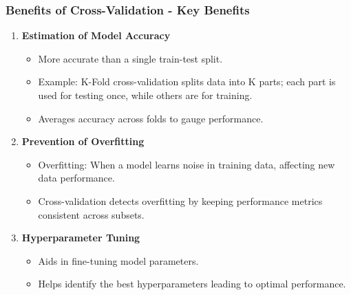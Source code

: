 \documentclass[aspectratio=169]{beamer}
\begin{document}
\begin{frame}[fragile]
    \frametitle{Benefits of Cross-Validation - Key Benefits}
    \begin{enumerate}
        \item \textbf{Estimation of Model Accuracy}
            \begin{itemize}
                \item More accurate than a single train-test split.
                \item Example: K-Fold cross-validation splits data into K parts; each part is used for testing once, while others are for training.
                \item Averages accuracy across folds to gauge performance.
            \end{itemize}
        
        \item \textbf{Prevention of Overfitting}
            \begin{itemize}
                \item Overfitting: When a model learns noise in training data, affecting new data performance.
                \item Cross-validation detects overfitting by keeping performance metrics consistent across subsets.
            \end{itemize}
        
        \item \textbf{Hyperparameter Tuning}
            \begin{itemize}
                \item Aids in fine-tuning model parameters.
                \item Helps identify the best hyperparameters leading to optimal performance.
            \end{itemize}
    \end{enumerate}
\end{frame}
\end{document}
